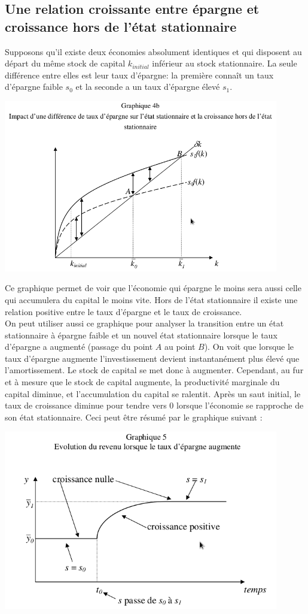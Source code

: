 \documentclass[10pt]{book}
\begin{document}
\subsection{Une relation croissante entre épargne et croissance hors de l'état stationnaire}
Supposons qu'il existe deux économies absolument identiques et qui disposent au départ du même stock de capital $k_{initial}$ inférieur au stock stationnaire. La seule différence entre elles est leur taux d'épargne: la première connaît un taux d'épargne faible $s_0$ et la seconde a un taux d'épargne élevé $s_1$. 
\begin{center}
  \includegraphics[width=12cm]{graph4.png}
\end{center}
Ce graphique permet de voir que l'économie qui épargne le moins sera aussi celle qui accumulera du capital le moins vite. Hors de l'état stationnaire il existe une relation positive entre le taux d'épargne et le taux de croissance. \\
On peut utiliser aussi ce graphique pour analyser la transition entre un état stationnaire à épargne faible et un nouvel état stationnaire lorsque le taux d'épargne a augmenté (passage du point $A$ au point $B$). On voit que lorsque le taux d'épargne augmente l'investissement devient instantanément plus élevé que l'amortissement. Le stock de capital se met donc à augmenter. Cependant, au fur et à mesure que le stock de capital augmente, la productivité marginale du capital diminue, et l'accumulation du capital se ralentit. Après un saut initial, le taux de croissance diminue pour tendre vers 0 lorsque l'économie se rapproche de son état stationnaire. Ceci peut être résumé par le graphique suivant : 
\begin{center}
  \includegraphics[width=12cm]{graph5.png}
\end{center}
\end{document}
